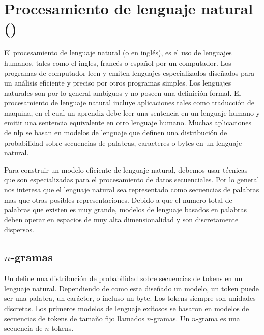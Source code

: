 
\section{Procesamiento de lenguaje natural ()}

El procesamiento de lenguaje natural (o  en inglés), es el uso de lenguajes humanos, tales como el ingles, francés o español por un computador. Los programas de computador leen y emiten lenguajes especializados diseñados para un análisis eficiente y preciso por otros programas simples. Los lenguajes naturales son por lo general ambiguos y no poseen una definición formal. El procesamiento de lenguaje natural incluye aplicaciones tales como traducción de maquina, en el cual un aprendiz debe leer una sentencia en un lenguaje humano y emitir una sentencia equivalente en otro lenguaje humano. Muchas aplicaciones de \gls{nlp} se basan en modelos de lenguaje que definen una distribución de probabilidad sobre secuencias de palabras, caracteres o bytes en un lenguaje natural.

Para construir un modelo eficiente de lenguaje natural, debemos usar técnicas que son especializadas para el procesamiento de datos secuenciales. Por lo general nos interesa que el lenguaje natural sea representado como secuencias de palabras mas que otras posibles representaciones. Debido a que el numero total de palabras que existen es muy grande, modelos de lenguaje basados en palabras deben operar en espacios de muy alta dimensionalidad y son discretamente dispersos.


\subsection{$n$-gramas} \label{ch:ngrams}
Un  define una distribución de probabilidad sobre secuencias de tokens en un lenguaje natural. Dependiendo de como esta diseñado un modelo, un token puede ser una palabra, un carácter, o incluso un byte. Los tokens siempre son unidades discretas. Los primeros modelos de lenguaje exitosos se basaron en modelos de secuencias de tokens de tamaño fijo llamados $n$-gramas. Un $n$-grama es una secuencia de $n$ tokens.

